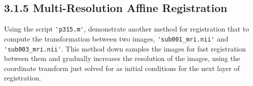 \documentclass{article}
\begin{document}
\begin{par}
		\begin{figure}[!h]
			\begin{floatrow}
			\end{floatrow}
		\end{figure}
		
		
		
		\subsection*{3.1.5  Multi-Resolution Affine Registration}
		Using the script \lstinline|'p315.m'|, demonstrate another method for registration that to compute the transformation between two images, \lstinline|'sub001_mri.nii'| and \lstinline|'sub003_mri.nii'|. This method down samples the images for fast registration between them and gradually increases the resolution of the images, using the coordinate transform just solved for as initial conditions for the next layer of registration. \\
		

\end{par}
\end{document}
